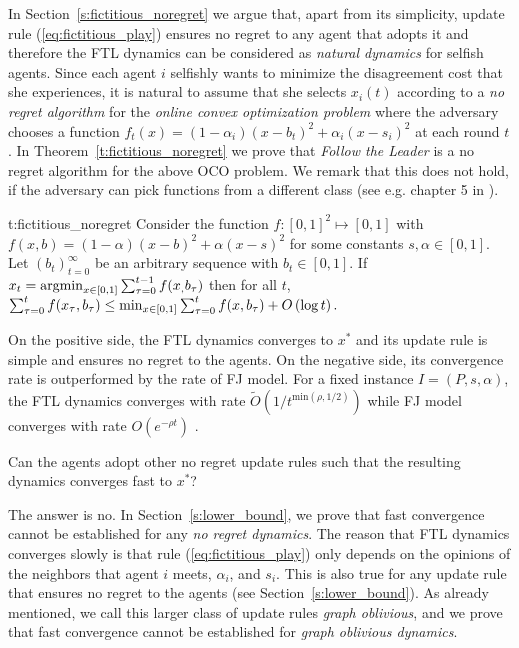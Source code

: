 In Section~\ref{s:fictitious_noregret} we argue that,
apart from its simplicity, update rule (\ref{eq:fictitious_play}) ensures
no regret to any agent that adopts it and therefore the FTL dynamics
can be considered as \emph{natural dynamics} for selfish agents.
Since each agent $i$ selfishly wants to minimize the disagreement cost
that she experiences, it is natural to assume that she selects $x_i(t)$ according to
a \emph{no regret algorithm} for the \emph{online convex optimization problem}
where the adversary chooses a function $f_t(x)=(1-\alpha_i)(x-b_t)^2 + \alpha_i(x-s_i)^2$
at each round $t$. In Theorem~\ref{t:fictitious_noregret}
we prove that \emph{Follow the Leader} is a no regret algorithm
for the above OCO problem. We remark that this does not hold,
if the adversary can pick functions from a different class
(see e.g. chapter 5 in \cite{Haz16}).

\begin{reptheorem}{t:fictitious_noregret}
  Consider the function $f:[0,1]^2 \mapsto [0,1]$ with
  $f(x,b) = (1-\alpha)(x-b)^2 + \alpha(x-s)^2$ for some
  constants $s,\alpha \in [0,1]$.
  Let $(b_t)_{t=0}^\infty$ be an arbitrary sequence with
  $b_t \in [0,1]$. If $x_t = \operatorname*{argmin}_{x \in [0,1]}\sum_{\tau=0}^{t-1}f(x_,b_\tau)$
  then for all $t$,
  \(
    \sum_{\tau=0}^{t}f(x_\tau,b_\tau) \leq
    \min_{x \in [0,1]}\sum_{\tau=0}^tf(x,b_\tau) + O\left(\log t\right).
  \)
\end{reptheorem}

On the positive side, the FTL dynamics converges to $x^*$ and its
update rule is simple and ensures no regret to the agents.
On the negative side, its convergence rate is outperformed by the rate of FJ
model.  For a fixed instance $I=(P,s,\alpha)$, the FTL dynamics converges with
rate $\widetilde{O}(1/t^{\text{min}(\rho,1/2)})$ while FJ model
converges with rate $O(e^{-\rho t})$ \cite{GS14}.

\begin{question}
  Can the agents adopt other no regret update rules such that the resulting
  dynamics converges fast to $x^*$?
\end{question}

The answer is no. In Section~\ref{s:lower_bound}, we prove that fast convergence cannot be established 
for any \emph{no regret dynamics}.
The reason that FTL dynamics converges slowly is that
 rule (\ref{eq:fictitious_play})
only depends on the opinions of the neighbors that agent $i$ meets,
$\alpha_i$, and $s_i$. This is also true for any update rule that
ensures no regret to the agents (see Section~\ref{s:lower_bound}).
As already mentioned, we call this larger class
of update rules \emph{graph oblivious}, and we prove that fast convergence
cannot be established for \emph{graph oblivious dynamics}.

